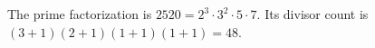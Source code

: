 The prime factorization is $2520=2^3\cdot3^2\cdot5\cdot7$. Its divisor count is $(3+1)(2+1)(1+1)(1+1)=\boxed{48}$.
